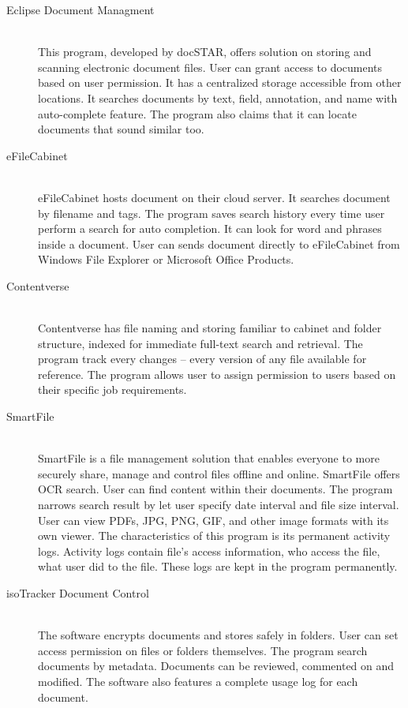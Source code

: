 \begin{description}
\item[Eclipse Document Managment] \hfill \\
This program, developed by docSTAR, offers solution on storing and scanning electronic document files.
User can grant access to documents based on user permission.
It has a centralized storage accessible from other locations.
It searches documents by text, field, annotation, and name with auto-complete feature.
The program also claims that it can locate documents that sound similar too.

\item[eFileCabinet] \hfill \\
eFileCabinet hosts document on their cloud server.
It searches document by filename and tags.
The program saves search history every time user perform a search for auto completion.
It can look for word and phrases inside a document.
User can sends document directly to eFileCabinet from Windows File Explorer or Microsoft Office Products.

\item[Contentverse] \hfill \\
Contentverse has file naming and storing familiar to cabinet and folder structure, indexed for immediate full-text search and retrieval.
The program track every changes -- every version of any file available for reference.
The program allows user to assign permission to users based on their specific job requirements.

\item[SmartFile] \hfill \\
SmartFile is a file management solution that enables everyone to more securely share, manage and control files offline and online.
SmartFile offers \gls{OCR} search.
User can find content within their documents.
The program narrows search result by let user specify date interval and file size interval.
User can view PDFs, JPG, PNG, GIF, and other image formats with its own viewer.
The characteristics of this program is its permanent activity logs.
Activity logs contain file's access information, who access the file, what user did to the file.
These logs are kept in the program permanently.

\item[isoTracker Document Control] \hfill \\
The software encrypts documents and stores safely in folders.
User can set access permission on files or folders themselves.
The program search documents by metadata.
Documents can be reviewed, commented on and modified. The software also features a complete usage log for each document.


\end{description}
